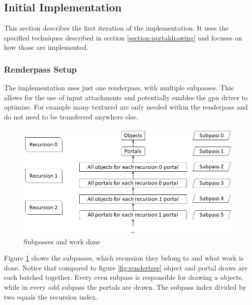 \subsection{Initial Implementation}
\label{section:intialimplementation}
This section describes the first iteration of the implementation. It uses the specified techniques described in section \ref{section:portaldrawing} and focuses on how those are implemented.


\subsubsection{Renderpass Setup}
\label{section:renderpasssetup}

The implementation uses just one renderpass, with multiple subpasses. This allows for the use of input attachments and potentially enables the \gls{gpu} driver to optimize. For example many textured are only needed within the renderpass and do not need to be transferred anywhere else.

\begin{figure}[h]
	\includegraphics[width=\linewidth]{images/renderpasses.png}
	\caption{Subpasses and work done}
	\label{fig:renderpasses}
\end{figure}


Figure \ref{fig:renderpasses} shows the subpasses, which recursion they belong to and what work is done. Notice that compared to figure \ref{fig:rendertree} object and portal draws are each batched together. Every even subpass is responsible for drawing a objects, while in every odd subpass the portals are drawn. The subpass index divided by two equals the recursion index. 

